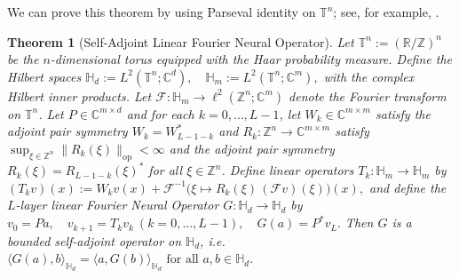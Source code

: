 \documentclass{article}
\theoremstyle{plain}
\newtheorem{theorem}{Theorem}[section]
\theoremstyle{definition}
\theoremstyle{remark}
\newcommand{\bbT}{\mathbb{T}}
\newcommand{\inner}[2]{\langle #1, #2 \rangle}
\newcommand{\F}{\mathcal{F}}
\newcommand{\Finve}{\mathcal{F}^{-1}}
\newcommand{\Hd}{\mathbb{H}_d}
\newcommand{\Hm}{\mathbb{H}_m}
\newcommand{\op}{\mathrm{op}}
\begin{document}
We can prove this theorem by using Parseval identity on $\bbT^n$; see, for example,
\cite{ReedSimonI, RieszNagy,EinsiedlerWard2017,Borthwick2020}.
\begin{theorem}[Self-Adjoint Linear Fourier Neural Operator]\label{safno}
Let
$\mathbb{T}^n := (\mathbb{R}/\mathbb{Z})^n$
be the $n$-dimensional torus equipped with the Haar probability measure.
Define the Hilbert spaces
$
\Hd := L^2(\mathbb{T}^n;\mathbb{C}^d),
\quad
\Hm := L^2(\mathbb{T}^n;\mathbb{C}^m),
$ 
with the complex Hilbert inner products.
Let
$
\F : \Hm \to \ell^2(\mathbb{Z}^n;\mathbb{C}^m)
$
denote the Fourier transform on $\mathbb{T}^n$.
Let $P\in\mathbb{C}^{m\times d}$ and for each $k=0,\dots,L-1$, let $W_k\in\mathbb{C}^{m\times m}$ satisfy the adjoint pair symmetry $W_k = W_{L-1-k}^*$
and $R_k:\mathbb{Z}^n\to\mathbb{C}^{m\times m}$ satisfy
      $\sup_{\xi\in\mathbb{Z}^n}\|R_k(\xi)\|_{\op}<\infty$ and the adjoint pair symmetry $R_k(\xi)=R_{L-1-k}(\xi)^*$
      for all $\xi\in\mathbb{Z}^n$.
Define linear operators $T_k:\Hm\to\Hm$ by
\(
(T_k v)(x)
:= W_k v(x)
 + \Finve\!\big(\xi\mapsto R_k(\xi)\,(\F v)(\xi)\big)(x),
\)
and define the $L$-layer linear Fourier Neural Operator $G:\Hd\to\Hd$ by
\(
v_0 = P a,
\quad
v_{k+1}=T_k v_k \ (k=0,\dots,L-1),
\quad
G(a)=P^* v_L.
\)
Then $G$ is a bounded self-adjoint operator on $\Hd$, i.e.
\(
\inner{G(a)}{b}_{\Hd}=\inner{a}{G(b)}_{\Hd}
\text{ for all }a,b\in\Hd.
\)
\end{theorem}
\end{document}
